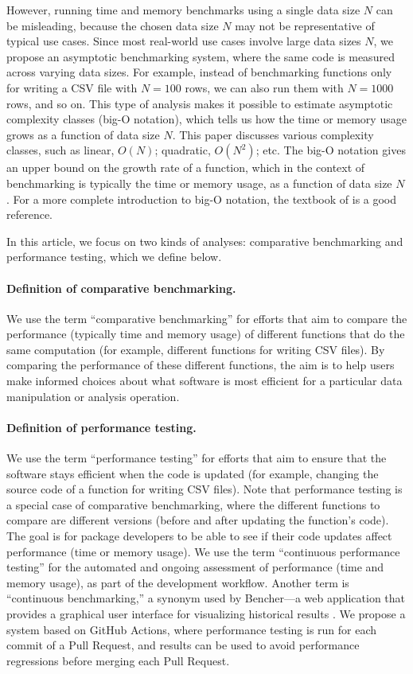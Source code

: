 However, running time and memory benchmarks using a single data size $N$ can be misleading, because the chosen data size $N$ may not be representative of typical use cases.
Since most real-world use cases involve large data sizes $N$, we propose an asymptotic benchmarking system, where the same code is measured across varying data sizes.
For example, instead of benchmarking functions only for writing a CSV file with $N = 100$ rows, we can also run them with $N = 1000$ rows, and so on. 
This type of analysis makes it possible to estimate asymptotic complexity classes (big-O notation), which tells us how the time or memory usage grows as a function of data size $N$.
This paper discusses various complexity classes, such as linear, $O(N)$; quadratic, $O(N^2)$; etc.
The big-O notation gives an upper bound on the growth rate of a function, which in the context of benchmarking is typically the time or memory usage, as a function of data size $N$.
For a more complete introduction to big-O notation, the textbook of \citet{cormen2009introduction} is a good reference.


In this article, we focus on two kinds of analyses: comparative benchmarking and performance testing, which we define below.
\paragraph{Definition of comparative benchmarking.}
We use the term ``comparative benchmarking'' for efforts that aim to compare the performance (typically time and memory usage) of different functions that do the same computation (for example, different functions for writing CSV files).
By comparing the performance of these different functions, the aim is to help users make informed choices about what software is most efficient for a particular data manipulation or analysis operation.
\paragraph{Definition of performance testing.}
We use the term ``performance testing'' for efforts that aim to ensure that the software stays efficient when the code is updated (for example, changing the source code of a function for writing CSV files). 
Note that performance testing is a special case of comparative benchmarking, where the different functions to compare are different versions (before and after updating the function's code). 
The goal is for package developers to be able to see if their code updates affect performance (time or memory usage).
We use the term ``continuous performance testing'' for the automated and ongoing assessment of performance (time and memory usage), as part of the development workflow. 
Another term is ``continuous benchmarking,'' a synonym used by Bencher---a web application that provides a graphical user interface for visualizing historical results \citep{bencher}.
We propose a system based on GitHub Actions, where performance testing is run for each commit of a Pull Request, and results can be used to avoid performance regressions before merging each Pull Request.

